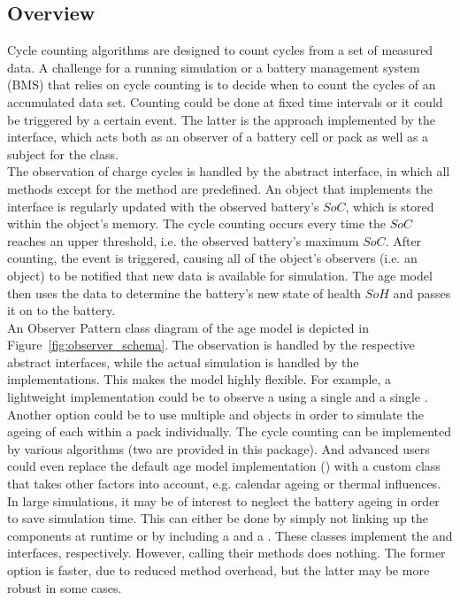 \subsection{Overview}
Cycle counting algorithms are designed to count cycles from a set of measured data. A challenge for a running simulation or a battery management system (BMS) that relies on cycle counting is to decide when to count the cycles of an accumulated data set. Counting could be done at fixed time intervals or it could be triggered by a certain event. The latter is the approach implemented by the  interface, which acts both as an observer of a battery cell or pack as well as a subject for the  class.\\
The observation of charge cycles is handled by the abstract  interface, in which all methods except for the  method are predefined. An object that implements the interface is regularly updated with the observed battery's $SoC$, which is stored within the object's memory. The cycle counting occurs every time the $SoC$ reaches an upper threshold, i.e. the observed battery's maximum $SoC$. After counting, the  event is triggered, causing all of the object's observers (i.e. an  object) to be notified that new data is available for simulation. The age model then uses the data to determine the battery's new state of health $SoH$ and passes it on to the battery. \\
An Observer Pattern class diagram of the age model is depicted in Figure~\ref{fig:observer_schema}. The observation is handled by the respective abstract interfaces, while the actual simulation is handled by the implementations. This makes the model highly flexible. For example, a lightweight implementation could be to observe a  using a single  and a single . Another option could be to use multiple  and  objects in order to simulate the ageing of each  within a pack individually. The cycle counting can be implemented by various algorithms (two are provided in this package). And advanced users could even replace the default age model implementation () with a custom class that takes other factors into account, e.g. calendar ageing or thermal influences. In large simulations, it may be of interest to neglect the battery ageing in order to save simulation time. This can either be done by simply not linking up the components at runtime or by including a  and a . These classes implement the  and  interfaces, respectively. However, calling their methods does nothing. The former option is faster, due to reduced method overhead, but the latter may be more robust in some cases.
